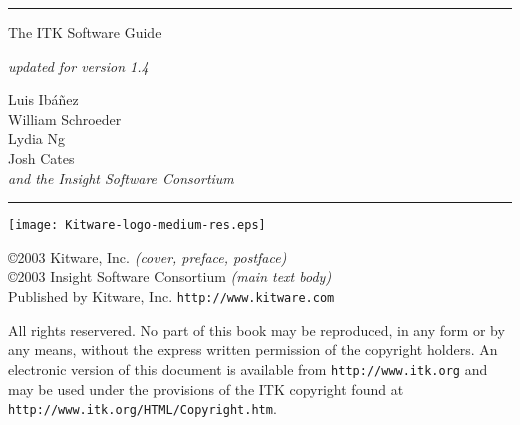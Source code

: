 
\begin{minipage}[t][3cm][b]{\textwidth}
\rule{14cm}{1pt}
\end{minipage}


\begin{minipage}[t][3cm][b]{\textwidth}
\Huge
The ITK Software Guide\\
\normalsize
\par
\emph{updated for version 1.4}\\
\end{minipage}

\hfill
\begin{minipage}[t][6cm][b]{0.6\textwidth}
\Large
\renewcommand{\baselinestretch}{1.5}
Luis Ib\'{a}\~{n}ez\\
William Schroeder\\
Lydia Ng\\
Josh Cates\\
\emph{and the Insight Software Consortium}
\normalsize
\end{minipage}


\begin{minipage}[t][2cm][b]{\textwidth}
\rule{14cm}{1pt}
\end{minipage}

\newpage

\begin{minipage}[t][4cm][b]{\textwidth}
\begin{center}
\texttt{[image: Kitware-logo-medium-res.eps]}
\end{center}
\par
\begin{center}
\large
\copyright 2003 Kitware, Inc. \emph{(cover, preface, postface)}\\
\copyright 2003 Insight Software Consortium \emph{(main text body)}\\
Published by Kitware, Inc. \texttt{http://www.kitware.com}
\normalsize
\end{center}
\end{minipage}


\begin{minipage}[t][3.0cm][b]{\textwidth}
\begin{center}
All rights reservered. No part of this book may be reproduced, in any form 
or by any means, without the express written permission of the copyright
holders. An electronic version of this document is available from
\texttt{http://www.itk.org} and may be used under the provisions of the
ITK copyright found at \texttt{http://www.itk.org/HTML/Copyright.htm}.
\end{center}
\end{minipage}


